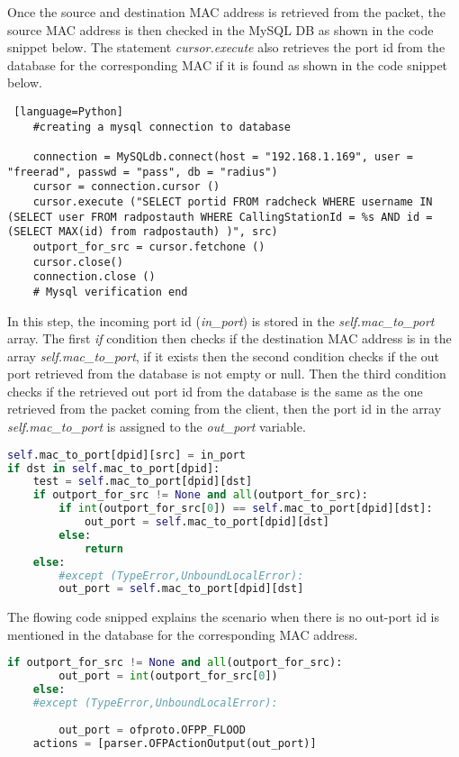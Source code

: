 Once the source and destination MAC address is retrieved from the packet, the source MAC address is then checked in the MySQL DB as shown in the code snippet below. The statement \textit{cursor.execute} also retrieves the port id from the database for the corresponding MAC if it is found as shown in the code snippet below.

\begin{lstlisting} [language=Python]
	#creating a mysql connection to database
		
	connection = MySQLdb.connect(host = "192.168.1.169", user = "freerad", passwd = "pass", db = "radius")
	cursor = connection.cursor ()
	cursor.execute ("SELECT portid FROM radcheck WHERE username IN (SELECT user FROM radpostauth WHERE CallingStationId = %s AND id = (SELECT MAX(id) from radpostauth) )", src)
	outport_for_src = cursor.fetchone ()	
	cursor.close()
	connection.close ()
	# Mysql verification end
\end{lstlisting}

In this step, the incoming port id (\textit{in\_port}) is stored in the \textit{self.mac\_to\_port} array. The first \textit{if} condition then checks if the destination MAC address is in the array \textit{self.mac\_to\_port}, if it exists then the second condition checks if the out port retrieved from the database is not empty or null. Then the third condition checks if the retrieved out port id from the database is the same as the one retrieved from the packet coming from the client, then the port id in the array \textit{self.mac\_to\_port} is assigned to the \textit{out\_port} variable.

\begin{lstlisting}[language=Python]
	    self.mac_to_port[dpid][src] = in_port
if dst in self.mac_to_port[dpid]:
	test = self.mac_to_port[dpid][dst]
	if outport_for_src != None and all(outport_for_src):
	    if int(outport_for_src[0]) == self.mac_to_port[dpid][dst]:
	    	out_port = self.mac_to_port[dpid][dst]
	    else:	
	    	return
    else:
	    #except (TypeError,UnboundLocalError):		
	    out_port = self.mac_to_port[dpid][dst]			
\end{lstlisting}

The flowing code snipped explains the scenario when there is no out-port id is mentioned in the database for the corresponding MAC address. 

\begin{lstlisting}[language=Python]
	if outport_for_src != None and all(outport_for_src):
		out_port = int(outport_for_src[0])
	else:
	#except (TypeError,UnboundLocalError):
	
		out_port = ofproto.OFPP_FLOOD
	actions = [parser.OFPActionOutput(out_port)]
\end{lstlisting}

